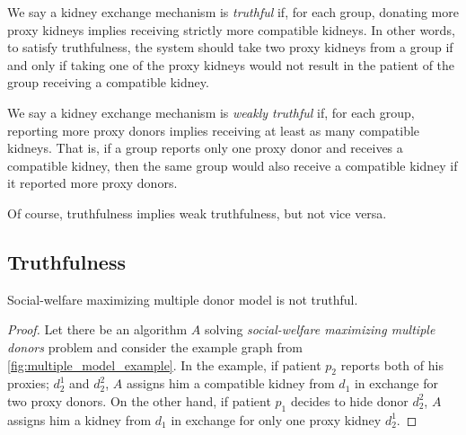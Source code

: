 \begin{definition}[Truthfulness]
We say a kidney exchange mechanism is \emph{truthful} if, for each group, donating more proxy kidneys implies receiving strictly more compatible kidneys. In other words, to satisfy truthfulness, the system should take two proxy kidneys from a group if and only if taking one of the proxy kidneys would not result in the patient of the group receiving a compatible kidney.
\end{definition}

\begin{definition}
We say a kidney exchange mechanism is \emph{weakly truthful} if, for each group, reporting more proxy donors implies receiving at least as many compatible kidneys. That is, if a group reports only one proxy donor and receives a compatible kidney, then the same group would also receive a compatible kidney if it reported more proxy donors.
\end{definition}

Of course, truthfulness implies weak truthfulness, but not vice versa.

\subsection{Truthfulness}
\begin{lemma}
    \label{lemma:social_walfare_not_strongly_truthful}
    Social-welfare maximizing multiple donor model is not truthful.
    \begin{proof}
        Let there be an algorithm $A$ solving \textit{social-welfare maximizing multiple donors} problem and consider the example graph from \autoref{fig:multiple_model_example}. In the example, if patient $p_2$ reports both of his proxies; $d_2^1$ and $d_2^2$, $A$ assigns him a compatible kidney from $d_1$ in exchange for two proxy donors. On the other hand, if patient $p_1$ decides to hide donor $d_2^2$, $A$ assigns him a kidney from $d_1$ in exchange for only one proxy kidney $d_2^1$.
    \end{proof}
\end{lemma}


